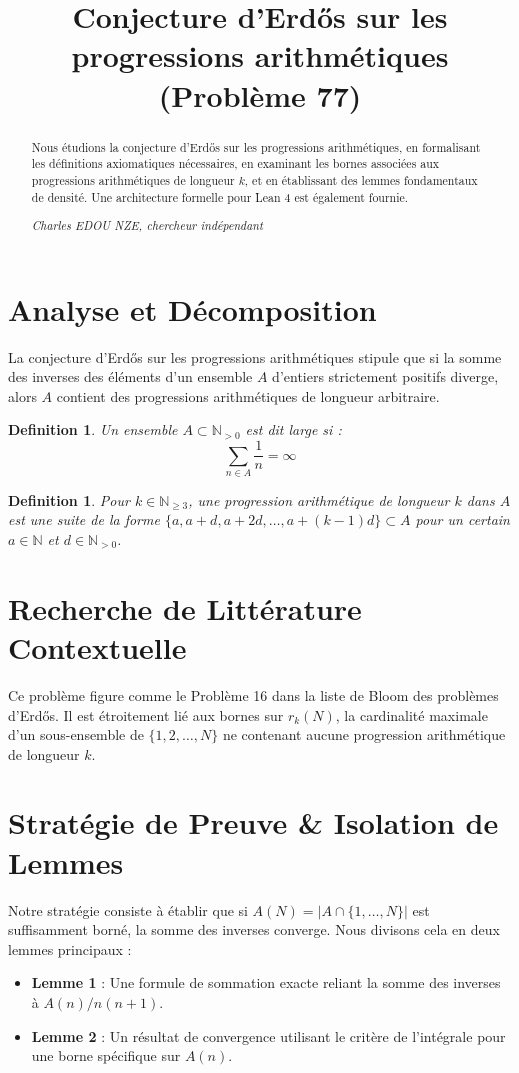 \documentclass[11pt, a4paper]{article}
\title{Conjecture d'Erdős sur les progressions arithmétiques (Problème 77)}
\author{}
\date{}
\newtheorem{definition}[theorem]{Definition}
\begin{document}
\maketitle

\begin{abstract}
Nous étudions la conjecture d'Erdős sur les progressions arithmétiques, en formalisant les définitions axiomatiques nécessaires, en examinant les bornes associées aux progressions arithmétiques de longueur $k$, et en établissant des lemmes fondamentaux de densité. Une architecture formelle pour Lean 4 est également fournie.
\vspace{1cm}
\begin{center}
\textit{Charles EDOU NZE, chercheur indépendant}
\end{center}
\end{abstract}

\section{Analyse et Décomposition}
La conjecture d'Erdős sur les progressions arithmétiques stipule que si la somme des inverses des éléments d'un ensemble $A$ d'entiers strictement positifs diverge, alors $A$ contient des progressions arithmétiques de longueur arbitraire.

\begin{definition}
Un ensemble $A \subset \mathbb{N}_{>0}$ est dit \textit{large} si :
$$ \sum_{n \in A} \frac{1}{n} = \infty $$
\end{definition}

\begin{definition}
Pour $k \in \mathbb{N}_{\ge 3}$, une progression arithmétique de longueur $k$ dans $A$ est une suite de la forme $\{a, a+d, a+2d, \dots, a+(k-1)d\} \subset A$ pour un certain $a \in \mathbb{N}$ et $d \in \mathbb{N}_{>0}$.
\end{definition}


\section{Recherche de Littérature Contextuelle}
Ce problème figure comme le Problème 16 dans la liste de Bloom des problèmes d'Erdős. Il est étroitement lié aux bornes sur $r_k(N)$, la cardinalité maximale d'un sous-ensemble de $\{1, 2, \dots, N\}$ ne contenant aucune progression arithmétique de longueur $k$.

\section{Stratégie de Preuve \& Isolation de Lemmes}
Notre stratégie consiste à établir que si $A(N) = |A \cap \{1, \dots, N\}|$ est suffisamment borné, la somme des inverses converge. Nous divisons cela en deux lemmes principaux :
\begin{itemize}
\item \textbf{Lemme 1} : Une formule de sommation exacte reliant la somme des inverses à $A(n)/n(n+1)$.
\item \textbf{Lemme 2} : Un résultat de convergence utilisant le critère de l'intégrale pour une borne spécifique sur $A(n)$.
\end{itemize}
\end{document}
